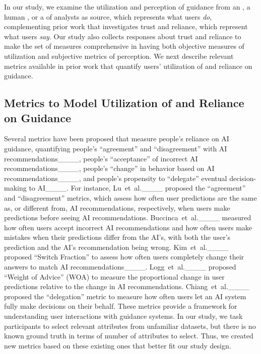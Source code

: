 In our study, we examine the utilization and perception of guidance from an \ai{}, a human \expert{}, or a \group{} of analysts as source, which represents what users \textit{do}, complementing prior work that investigates trust and reliance, which represent what users \textit{say}. Our study also collects  responses about trust and reliance to make the set of measures comprehensive in having both objective measures of utilization and subjective metrics of perception. We next describe relevant metrics available in prior work that quantify users' utilization of and reliance on guidance.

\subsection{Metrics to Model Utilization of and Reliance on Guidance}
Several metrics have been proposed that measure people's reliance on AI guidance, quantifying people's ``agreement'' and ``disagreement'' with AI recommendations____, people's ``acceptance'' of incorrect AI recommendations____, 
people's ``change'' in behavior based on AI recommendations____, 
and people's propensity to ``delegate'' eventual decision-making to AI____. 
For instance, 
Lu~et~al.____ proposed the ``agreement'' and ``disagreement'' metrics, which assess how often user predictions are the same as, or different from, AI recommendations, respectively, when users make predictions before seeing AI recommendations.
Buccinca~et~al.____ measured how often users accept incorrect AI recommendations and how often users make mistakes when their predictions differ from the AI's, with both the user's prediction and the AI's recommendation being wrong.
Kim~et~al.____ proposed ``Switch Fraction'' to assess how often users completely change their answers to match AI recommendations____.
Logg~et~al.____ proposed ``Weight of Advice'' (WOA) to measure the proportional change in user predictions relative to the change in AI recommendations. 
Chiang~et~al.____ proposed the ``delegation'' metric to measure how often users let an AI system fully make decisions on their behalf.
These metrics provide a framework for understanding user interactions with guidance systems. In our study, we task participants to select relevant attributes from unfamiliar datasets, but there is no known ground truth in terms of number of attributes to select. Thus, we created new metrics based on these existing ones that better fit our study design.

